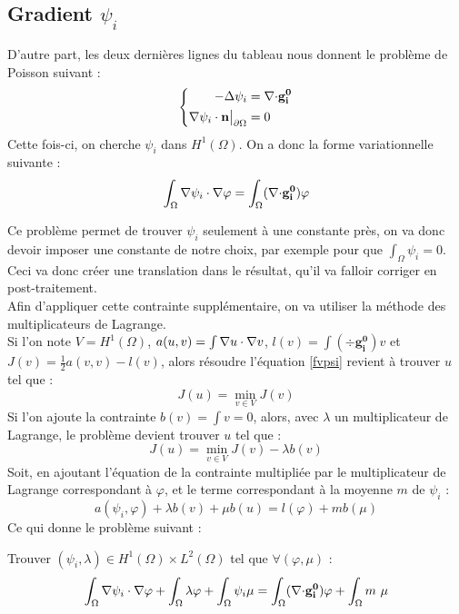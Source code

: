 \subsection{Gradient $\psi_i$}
\label{multLagrange}
D'autre part, les deux dernières lignes du tableau nous donnent le problème de Poisson suivant :
\begin{equation*}
\left\{\begin{aligned}
-{\Delta}\psi_i &= {\nabla\cdot} \mathbf{g_i^0}\\
{\nabla}\psi_i\cdot \mathbf{n}{\big\rvert_{\partial\Omega}} &= 0
\end{aligned}\right.
\end{equation*}
Cette fois-ci, on cherche $\psi_i$ dans $H^1(\Omega)$. On a donc la forme variationnelle suivante :
\begin{equation}\label{fvpsi}
\int_\Omega {\nabla}\psi_i\cdot{\nabla}\varphi = \int_\Omega ({\nabla\cdot} \mathbf{g_i^0})\varphi
\end{equation}

Ce problème permet de trouver $\psi_i$ seulement à une constante près, on va donc devoir imposer une constante de notre choix, par exemple pour que $\int_\Omega \psi_i = 0$. Ceci va donc créer une translation dans le résultat, qu'il va falloir corriger en post-traitement.\\
Afin d'appliquer cette contrainte supplémentaire, on va utiliser la méthode des multiplicateurs de Lagrange.\\
Si l'on note $V=H^1(\Omega)$, $a(u,v)=\int {\nabla} u \cdot {\nabla} v$, $l(v)=\int (\div \mathbf{g_i^0})v$ et $J(v)=\frac{1}{2}a(v,v)-l(v)$, alors résoudre l'équation \ref{fvpsi} revient à trouver $u$ tel que :
\[ J(u) = \min_{v\in V} J(v) \]
Si l'on ajoute la contrainte $b(v) = \int v = 0$, alors, avec $\lambda$ un multiplicateur de Lagrange, le problème devient trouver $u$ tel que :
\[ J(u) = \min_{v\in V} J(v) - \lambda b(v) \]
Soit, en ajoutant l'équation de la contrainte multipliée par le multiplicateur de Lagrange correspondant à $\varphi$, et le terme correspondant à la moyenne $m$ de $\psi_i$ :
\[ a(\psi_i,\varphi) + \lambda b(v) + \mu b(u) = l(\varphi) + m b(\mu) \]
Ce qui donne le problème suivant :
\begin{pb}\label{fvpsiml}
Trouver $(\psi_i,\lambda)\in H^1(\Omega)\times L^2(\Omega)$ tel que $\forall (\varphi,\mu)$ :
\begin{equation*}
\int_\Omega {\nabla}\psi_i\cdot{\nabla}\varphi + \int_\Omega \lambda\varphi + \int_\Omega \psi_i\mu = \int_\Omega ({\nabla\cdot} \mathbf{g_i^0})\varphi + \int_\Omega m\ \mu
\end{equation*}\end{pb}
